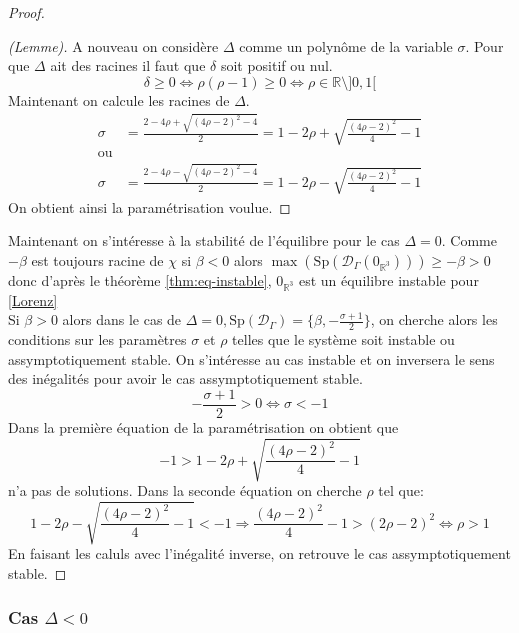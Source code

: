 \documentclass{article}
\newcommand{\R}{\mathbb{R}}
\newtheorem[M , nocut]{prop}{Proposition}[section]
\newtheorem[S , nocut]{definition}{Définition}
\newtheorem[S , nocut]{lemme}{Lemme}
\newtheorem[L , nocut]{thm}{Théoreme}
\newtheorem[L , nocut]{cor}{Corollaire}
\begin{document}
\begin{proof}
    \begin{proof}[(Lemme)]
        A nouveau on considère $\Delta$ comme un polynôme de la variable $\sigma$. Pour que $\Delta$ ait des racines il faut que $\delta$ soit positif ou nul.
        \[
        \delta \ge 0 \Leftrightarrow \rho(\rho-1) \ge 0 \Leftrightarrow \rho \in \R \setminus ]0,1[
        \] Maintenant on calcule les racines de $\Delta$.
        \begin{align*}
            \sigma &= \frac{2-4\rho + \sqrt{ (4\rho-2)^2 -4 }}{2} = 1-2 \rho + \sqrt{ \frac{(4\rho-2)^2}{4} -1 }\\
            \text{ou}\\
            \sigma &= \frac{2-4\rho - \sqrt{ (4\rho-2)^2 -4 }}{2} = 1-2 \rho - \sqrt{ \frac{(4\rho-2)^2}{4} -1 }
        \end{align*}
        On obtient ainsi la paramétrisation voulue.
    \end{proof}
    Maintenant on s'intéresse à la stabilité de l'équilibre pour le cas $\Delta=0$. Comme $-\beta$ est toujours racine de $\chi$ si $\beta <0$ alors $\max (\mathrm{Sp}(\mathcal{D}_\Gamma (0_{\R^3}))) \ge -\beta > 0$ donc d'après le théorème \ref{thm:eq-instable}, $0_{\R^3}$ est un équilibre instable pour \eqref{Lorenz}\\
    Si $\beta > 0$ alors dans le cas de $\Delta = 0, \mathrm{Sp}(\mathcal{D}_\Gamma) = \{\beta, -\frac{\sigma+1}{2}\}$, on cherche alors les conditions sur les paramètres $\sigma$ et $\rho$ telles que le système soit instable ou assymptotiquement stable.
    On s'intéresse au cas instable et on inversera le sens des inégalités pour avoir le cas assymptotiquement stable. 
    \[
        -\frac{\sigma+1}{2} >0 \Leftrightarrow \sigma < -1   
    \]
    Dans la première équation de la paramétrisation on obtient que 
    \[-1 > 1-2 \rho + \sqrt{ \frac{(4\rho-2)^2}{4} -1}\] n'a pas de solutions.
    Dans la seconde équation on cherche $\rho$ tel que:
    \[
        1-2 \rho - \sqrt{ \frac{(4\rho-2)^2}{4} -1 } < -1 \Rightarrow \frac{(4\rho-2)^2}{4} -1 > (2\rho-2)^2 \Leftrightarrow \rho > 1 
    \]En faisant les caluls avec l'inégalité inverse, on retrouve le cas assymptotiquement stable.
\end{proof}

\subsubsection*{Cas $\Delta < 0$}
\end{document}
